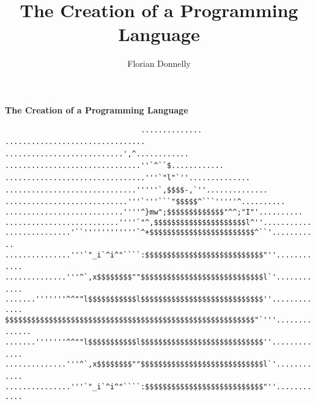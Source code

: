 \documentclass[12pt,a4paper]{article}
\author{Florian Donnelly}
\title{The Creation of a Programming Language}
\begin{document}
\begin{titlepage}\begin{center}

    \vspace*{1.5cm}
    \Huge
    \textbf{The Creation of a Programming Language}

    \vspace{1.5cm}
    \tiny
    \verb|                               ..............                               |\linebreak
    \verb|                      ................................                      |\linebreak
    \verb|                 ...........................',^............                 |\linebreak
    \verb|             ...............................''`^``$............             |\linebreak
    \verb|          ................................'''`"l"`''..............          |\linebreak
    \verb|        ..............................'''''`,$$$$-,`''..............        |\linebreak
    \verb|      ............................'''`'''```"$$$$$^```'''''^..........      |\linebreak
    \verb|    ...........................''''^}mw";$$$$$$$$$$$$$"^^;"I"'..........    |\linebreak
    \verb|   ..........................''''`"^,$$$$$$$$$$$$$$$$$$$$$l^''...........   |\linebreak
    \verb|  ...............'``''''''''''''`^+$$$$$$$$$$$$$$$$$$$$$$$$^``'...........  |\linebreak
    \verb| ...............'''`"_i`^i^"````:$$$$$$$$$$$$$$$$$$$$$$$$$$$"''............ |\linebreak
    \verb| ..............'''^`,x$$$$$$$$""$$$$$$$$$$$$$$$$$$$$$$$$$$$$l`'............ |\linebreak
    \verb| .......'''''''^^""l$$$$$$$$$$$l$$$$$$$$$$$$$$$$$$$$$$$$$$$$''............. |\linebreak
    \verb|$$$$$$$$$$$$$$$$$$$$$$$$$$$$$$$$$$$$$$$$$$$$$$$$$$$$$$$$$"`'''..............|\linebreak
    \verb| .......'''''''^^""l$$$$$$$$$$$l$$$$$$$$$$$$$$$$$$$$$$$$$$$$''............. |\linebreak
    \verb| ..............'''^`,x$$$$$$$$""$$$$$$$$$$$$$$$$$$$$$$$$$$$$l`'............ |\linebreak
    \verb| ...............'''`"_i`^i^"````:$$$$$$$$$$$$$$$$$$$$$$$$$$$"''............ |\linebreak

\end{center}
\end{titlepage}
\end{document}
